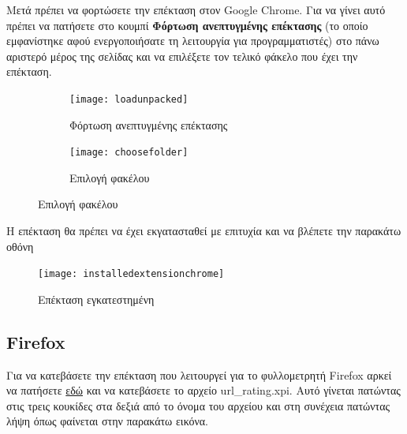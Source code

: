 \documentclass{article}
\begin{document}
Μετά πρέπει να φορτώσετε την επέκταση στον Google Chrome. Για να γίνει αυτό πρέπει να πατήσετε στο κουμπί \textbf{Φόρτωση ανεπτυγμένης επέκτασης} (το οποίο εμφανίστηκε αφού ενεργοποιήσατε τη λειτουργία για προγραμματιστές) στο πάνω αριστερό μέρος της σελίδας και να επιλέξετε τον τελικό φάκελο που έχει την επέκταση.

\begin{figure}[H]
    \centering
    \begin{minipage}[t]{0.45\textwidth}
        \centering
        \begin{subfigure}[t]{\textwidth}
            \texttt{[image: loadunpacked]}
        \caption{Φόρτωση ανεπτυγμένης επέκτασης}
        \label{Fig:loadunpacked}
        \end{subfigure}
        \vspace{\fill}
    \end{minipage}
    \hfill
    \begin{minipage}{0.45\textwidth}
        \begin{subfigure}{\textwidth}
            \texttt{[image: choosefolder]}
            \caption{Επιλογή φακέλου}
            \label{Fig:choosefolder}
        \end{subfigure}
    \end{minipage}
\end{figure}

Η επέκταση θα πρέπει να έχει εκγατασταθεί με επιτυχία και να βλέπετε την παρακάτω οθόνη
\begin{figure}[H]
    \texttt{[image: installedextensionchrome]}
    \caption*{Επέκταση εγκατεστημένη}
\end{figure}

\cleardoublepage
{}
\subsection*{Firefox}

Για να κατεβάσετε την επέκταση που λειτουργεί για το φυλλομετρητή Firefox αρκεί να πατήσετε \href{https://drive.google.com/drive/folders/191-K02IJk3PNCtMcF94pB9eTDhVBnS2K?usp=share_link}{εδώ} και να κατεβάσετε το αρχείο url\_rating.xpi. Αυτό γίνεται πατώντας στις τρεις κουκίδες στα δεξιά από το όνομα του αρχείου και στη συνέχεια πατώντας λήψη όπως φαίνεται στην παρακάτω εικόνα.
\end{document}
